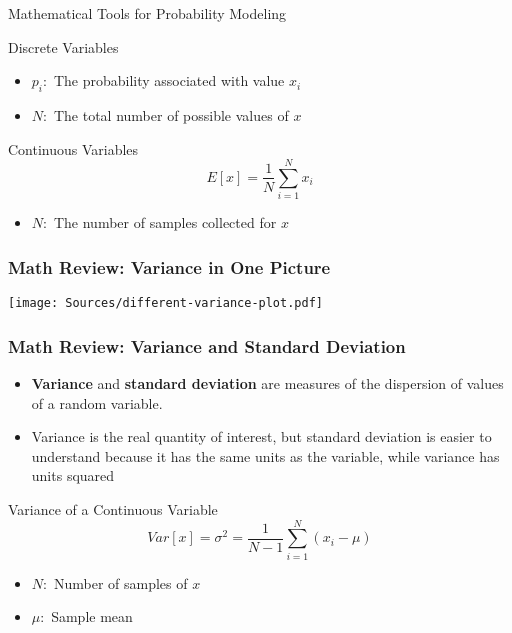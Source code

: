 \documentclass[handout, 11pt]{beamer}
\begin{document}
\begin{section}{Mathematical Tools for Probability Modeling}
\begin{frame}
\begin{block}{Discrete Variables}
\begin{itemize}
A specific value for
$x$
\item $p_i:$
The probability associated with value
$x_i$
\item $N:$
The total number of possible values of
$x$
\end{itemize}
\end{block}
\begin{block}{Continuous Variables}
\begin{equation}
	E[x] = \frac{1}{N} \sum_{i=1}^{N} x_i
\end{equation}
\vspace{-0.4cm}
\begin{itemize}
\item $N:$
The number of samples collected for
$x$
\end{itemize}
\end{block}
\end{frame}
\begin{frame}
\frametitle{Math Review: Variance in One Picture}
\begin{center}
\begin{adjustbox}{width=0.9\textwidth, height=0.8\textheight, keepaspectratio}
\texttt{[image: Sources/different-variance-plot.pdf]}
\end{adjustbox}
\end{center}
\end{frame}
\begin{frame}
\frametitle{Math Review: Variance and Standard Deviation}
\footnotesize
\begin{itemize}
\item \textbf{Variance}
and
\textbf{standard deviation}
are measures of the dispersion of values of a random variable.
\item Variance is the real quantity of interest, but standard deviation is easier to understand because it has the same units as the variable, while variance has units squared
\end{itemize}
\begin{block}{Variance of a Continuous Variable}
\begin{equation}
	Var[x] = \sigma^2 = \frac{1}{N - 1} \sum_{i=1}^{N} (x_i - \mu)
\end{equation}
\vspace{-0.3cm}
\begin{itemize}
\item $N:$
Number of samples of
$x$
\item $\mu:$
Sample mean
\end{itemize}

\end{block}
\end{frame}
\end{section}
\end{document}
